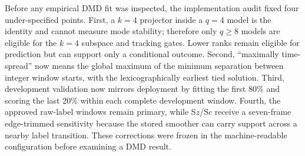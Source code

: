 \documentclass[11pt,a4paper]{article}
\begin{document}
\begin{decisionbox}
Before any empirical DMD fit was inspected, the implementation audit fixed four
under-specified points. First, a $k=4$ projector inside a $q=4$ model is the
identity and cannot measure mode stability; therefore only $q\geq8$ models are
eligible for the $k=4$ subspace and tracking gates. Lower ranks remain eligible
for prediction but can support only a conditional outcome. Second, ``maximally
time-spread'' now means the global maximum of the minimum separation between
integer window starts, with the lexicographically earliest tied solution. Third,
development validation now mirrors deployment by fitting the first 80\% and
scoring the last 20\% within each complete development window. Fourth, the
approved raw-label windows remain primary, while S$z$/S$c$ receive a seven-frame
edge-trimmed sensitivity because the stored smoother can carry support across a
nearby label transition. These corrections were frozen in the machine-readable
configuration before examining a DMD result.
\end{decisionbox}
\end{document}
